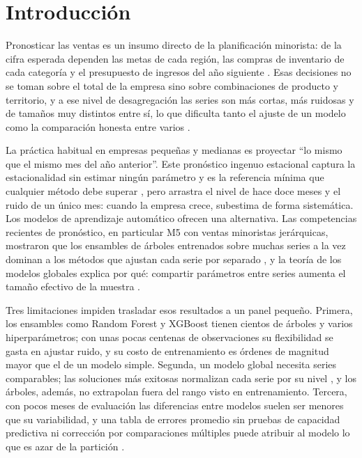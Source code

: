 \documentclass[pdflatex,sn-mathphys-num]{sn-jnl}
\begin{document}
\section{Introducción}\label{sec:intro}

Pronosticar las ventas es un insumo directo de la planificación minorista: de la cifra esperada dependen las metas de cada región, las compras de inventario de cada categoría y el presupuesto de ingresos del año siguiente \cite{fildes2022}. Esas decisiones no se toman sobre el total de la empresa sino sobre combinaciones de producto y territorio, y a ese nivel de desagregación las series son más cortas, más ruidosas y de tamaños muy distintos entre sí, lo que dificulta tanto el ajuste de un modelo como la comparación honesta entre varios \cite{fildes2022,hyndman2021}.

La práctica habitual en empresas pequeñas y medianas es proyectar ``lo mismo que el mismo mes del año anterior''. Este pronóstico ingenuo estacional captura la estacionalidad sin estimar ningún parámetro y es la referencia mínima que cualquier método debe superar \cite{hyndman2021}, pero arrastra el nivel de hace doce meses y el ruido de un único mes: cuando la empresa crece, subestima de forma sistemática. Los modelos de aprendizaje automático ofrecen una alternativa. Las competencias recientes de pronóstico, en particular M5 con ventas minoristas jerárquicas, mostraron que los ensambles de árboles entrenados sobre muchas series a la vez dominan a los métodos que ajustan cada serie por separado \cite{makridakis2022}, y la teoría de los modelos globales explica por qué: compartir parámetros entre series aumenta el tamaño efectivo de la muestra \cite{monteromanso2021}.

Tres limitaciones impiden trasladar esos resultados a un panel pequeño. Primera, los ensambles como Random Forest \cite{breiman2001} y XGBoost \cite{chen2016} tienen cientos de árboles y varios hiperparámetros; con unas pocas centenas de observaciones su flexibilidad se gasta en ajustar ruido, y su costo de entrenamiento es órdenes de magnitud mayor que el de un modelo simple. Segunda, un modelo global necesita series comparables; las soluciones más exitosas normalizan cada serie por su nivel \cite{salinas2020,smyl2020}, y los árboles, además, no extrapolan fuera del rango visto en entrenamiento. Tercera, con pocos meses de evaluación las diferencias entre modelos suelen ser menores que su variabilidad, y una tabla de errores promedio sin pruebas de capacidad predictiva \cite{diebold1995,giacomini2006} ni corrección por comparaciones múltiples \cite{holm1979} puede atribuir al modelo lo que es azar de la partición \cite{cerqueira2020}.
\end{document}
